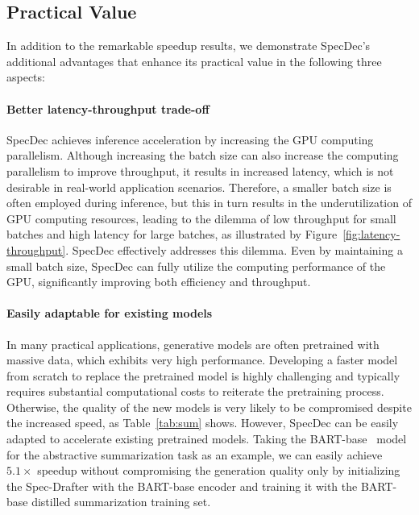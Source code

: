 \subsection{Practical Value}
\label{sec:practical}
In addition to the remarkable speedup results, we demonstrate SpecDec's additional advantages that enhance its practical value in the following three aspects:

\paragraph{Better latency-throughput trade-off} SpecDec achieves inference acceleration by increasing the GPU computing parallelism. Although increasing the batch size can also increase the computing parallelism to improve throughput, it results in increased latency, which is not desirable in real-world application scenarios. Therefore, a smaller batch size is often employed during inference, but this in turn results in the underutilization of GPU computing resources, leading to the dilemma of low throughput for small batches and high latency for large batches, as illustrated by Figure~\ref{fig:latency-throughput}. SpecDec effectively addresses this dilemma. Even by maintaining a small batch size, SpecDec can fully utilize the computing performance of the GPU, significantly improving both efficiency and throughput.

\paragraph{Easily adaptable for existing models} In many practical applications, generative models are often pretrained with massive data, which exhibits very high performance. Developing a faster model from scratch to replace the pretrained model is highly challenging and typically requires substantial computational costs to reiterate the pretraining process. Otherwise, the quality of the new models is very likely to be compromised despite the increased speed, as Table~\ref{tab:sum} shows. However, SpecDec can be easily adapted to accelerate existing pretrained models. Taking the BART-base~\cite{Lewis:2020} model for the abstractive summarization task as an example, we can easily achieve $5.1\times$ speedup without compromising the generation quality only by initializing the Spec-Drafter with the BART-base encoder and training it with the BART-base distilled summarization training set. 


